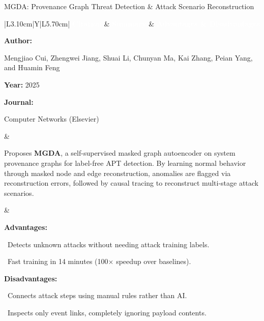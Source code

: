 \documentclass[aspectratio=169,10pt]{beamer}
\newcommand{\lrhdr}{%
  \rowcolor{prismNavy}%
  {\scriptsize\textcolor{white}{\textbf{Citation}}} &
  {\scriptsize\textcolor{white}{\textbf{Summary}}} &
  {\scriptsize\textcolor{white}{\textbf{Advantages \& Disadvantages}}} \\}
\begin{document}
\begin{frame}[t]{MGDA: Provenance Graph Threat Detection \& Attack Scenario Reconstruction}
\vspace{-0.30em}
{\footnotesize\setlength{\tabcolsep}{3.5pt}\renewcommand{\arraystretch}{1.10}
\begin{tabularx}{\textwidth}{|L{3.10cm}|Y|L{5.70cm}|}
\hline\lrhdr\hline
\begin{minipage}[t]{\linewidth}\fontsize{7.2pt}{9.2pt}\raggedright\selectfont
\textbf{Author:}\par
Mengjiao Cui, Zhengwei Jiang, Shuai Li, Chunyan Ma, Kai Zhang, Peian Yang, and Huamin Feng\par\vspace{4pt}
\textbf{Year:} 2025\par\vspace{4pt}
\textbf{Journal:}\par
Computer Networks (Elsevier)\par\vspace{4pt}
\end{minipage}
&
\begin{minipage}[t]{\linewidth}\fontsize{7.2pt}{9.2pt}\raggedright\selectfont
Proposes \textbf{MGDA}, a self-supervised masked graph autoencoder on system provenance graphs for label-free APT detection. By learning normal behavior through masked node and edge reconstruction, anomalies are flagged via reconstruction errors, followed by causal tracing to reconstruct multi-stage attack scenarios.\par\vspace{4pt}
\end{minipage}
&
\begin{minipage}[t]{\linewidth}\fontsize{7.2pt}{9.0pt}\raggedright\selectfont
\textcolor{strengthGreen}{\textbf{Advantages:}}\par\vspace{1.5pt}
\textbullet~Detects unknown attacks without needing attack training labels.\par\vspace{2.0pt}\textbullet~Fast training in 14 minutes (100$\times$ speedup over baselines).\par\vspace{4.0pt}
\textcolor{limitRed}{\textbf{Disadvantages:}}\par\vspace{1.5pt}
\textbullet~Connects attack steps using manual rules rather than AI.\par\vspace{2.0pt}\textbullet~Inspects only event links, completely ignoring payload contents.\par\vspace{4pt}
\end{minipage} \\\hline
\end{tabularx}}
\end{frame}
\end{document}
